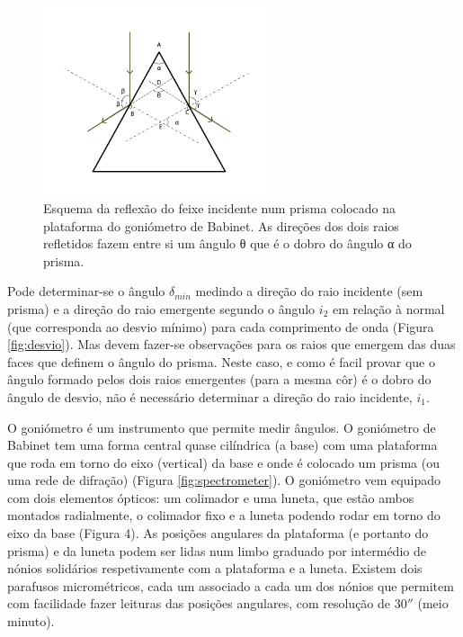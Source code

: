 \documentclass[a4paper,12pt]{article}  %
\begin{document}
\begin{figure}[tb]  \centering 
	\includegraphics[width=0.6\textwidth]{angulo}
	\caption{Esquema da reflexão do feixe incidente num prisma colocado na plataforma do goniómetro de Babinet. As direções dos dois raios refletidos fazem entre si um ângulo θ que é o dobro do ângulo α do prisma. \label{fig:angulo}} 
\end{figure}

Pode determinar-se o ângulo $\delta_{min}$ medindo a direção do raio incidente (sem prisma) e a direção do raio emergente segundo o ângulo $i_2$ em relação à normal (que corresponda ao desvio mínimo) para cada comprimento de onda (Figura \ref{fig:desvio}). Mas devem fazer-se observações para os raios que emergem das duas faces que definem o ângulo do prisma. Neste caso, e como é facil provar que o ângulo formado pelos dois raios emergentes (para a mesma côr) é o dobro do ângulo de desvio, não é necessário determinar a direção do raio incidente, $i_1$.

O goniómetro é um instrumento que permite medir ângulos. O goniómetro de Babinet tem uma forma central quase cilíndrica (a base) com uma plataforma que roda em torno do eixo (vertical) da base e onde é colocado um prisma (ou uma rede de difração) (Figura \ref{fig:spectrometer}). O goniómetro vem equipado com dois elementos ópticos: um colimador e uma luneta, que estão ambos montados radialmente, o colimador fixo e a luneta podendo rodar em torno do eixo da base (Figura 4). As posições angulares da plataforma (e portanto do prisma) e da luneta podem ser lidas num limbo graduado por intermédio de nónios solidários respetivamente com a plataforma e a luneta. Existem dois parafusos micrométricos, cada um associado a cada um dos nónios que permitem com facilidade fazer leituras das posições angulares, com resolução de $30''$ (meio minuto).
\end{document}
